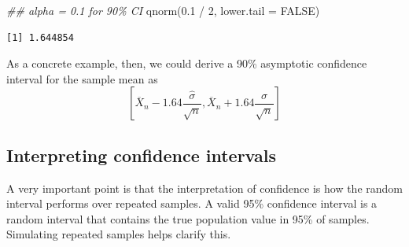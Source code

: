 \documentclass[
  13pt,
  letterpaper,
  DIV=11,
  numbers=noendperiod]{scrreprt}
\newenvironment{Shaded}{\begin{snugshade}}{\end{snugshade}}
\newcommand{\AttributeTok}[1]{\textcolor[rgb]{0.40,0.45,0.13}{#1}}
\newcommand{\ConstantTok}[1]{\textcolor[rgb]{0.56,0.35,0.01}{#1}}
\newcommand{\DecValTok}[1]{\textcolor[rgb]{0.68,0.00,0.00}{#1}}
\newcommand{\DocumentationTok}[1]{\textcolor[rgb]{0.37,0.37,0.37}{\textit{#1}}}
\newcommand{\FloatTok}[1]{\textcolor[rgb]{0.68,0.00,0.00}{#1}}
\newcommand{\FunctionTok}[1]{\textcolor[rgb]{0.28,0.35,0.67}{#1}}
\newcommand{\NormalTok}[1]{\textcolor[rgb]{0.00,0.23,0.31}{#1}}
\newcommand{\SpecialCharTok}[1]{\textcolor[rgb]{0.37,0.37,0.37}{#1}}
\newcommand{\Xbar}{\overline{X}}
\theoremstyle{plain}
\theoremstyle{definition}
\theoremstyle{definition}
\theoremstyle{remark}
\begin{document}
\begin{Shaded}
\begin{Highlighting}[]
\DocumentationTok{\#\# alpha = 0.1 for 90\% CI}
\FunctionTok{qnorm}\NormalTok{(}\FloatTok{0.1} \SpecialCharTok{/} \DecValTok{2}\NormalTok{, }\AttributeTok{lower.tail =} \ConstantTok{FALSE}\NormalTok{)}
\end{Highlighting}
\end{Shaded}

\begin{verbatim}
[1] 1.644854
\end{verbatim}

As a concrete example, then, we could derive a 90\% asymptotic
confidence interval for the sample mean as \[ 
\left[\Xbar_{n} - 1.64 \frac{\widehat{\sigma}}{\sqrt{n}}, \Xbar_{n} + 1.64 \frac{\widehat{\sigma}}{\sqrt{n}}\right]
\]

\subsection{Interpreting confidence
intervals}\label{interpreting-confidence-intervals}

A very important point is that the interpretation of confidence is how
the random interval performs over repeated samples. A valid 95\%
confidence interval is a random interval that contains the true
population value in 95\% of samples. Simulating repeated samples helps
clarify this.
\end{document}
